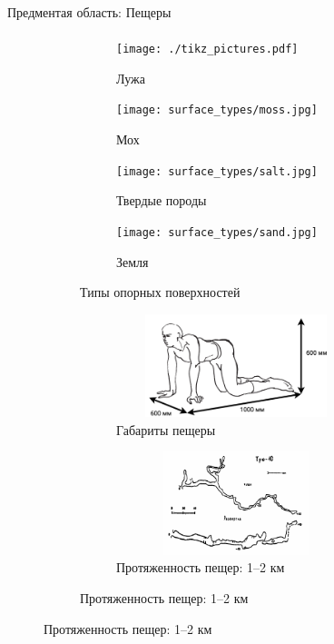 \begin{frame}[t]{Предментая область: Пещеры}
    \framesubtitle{}
    \vspace{-0.8cm}
    \begin{figure}[H]
        \begin{subfigure}{0.49\textwidth}
            \begin{subfigure}[b]{0.49\textwidth}
                \centering\texttt{[image: ./tikz\_pictures.pdf]}
                \caption{Лужа}
            \end{subfigure}
            \hfill
            \begin{subfigure}[b]{0.49\textwidth}
                \centering\texttt{[image: surface\_types/moss.jpg]}\\
                \caption{Мох}
            \end{subfigure}

            \begin{subfigure}[b]{0.49\textwidth}
                \centering\texttt{[image: surface\_types/salt.jpg]}\\
                \caption{Твердые породы}
            \end{subfigure}
            \begin{subfigure}[b]{0.49\textwidth}
                \centering\texttt{[image: surface\_types/sand.jpg]}\\
                \caption{Земля}
            \end{subfigure}
            \caption*{Типы опорных поверхностей}
        \end{subfigure}
        \begin{subfigure}{0.49\textwidth}
            \begin{subfigure}{0.99\textwidth}
                \centering\includegraphics[height=3cm,width=1\textwidth,keepaspectratio]{../images/human_crawling.png}
                \caption*{Габариты пещеры}
            \end{subfigure}

            \begin{subfigure}{0.99\textwidth}
                \centering\includegraphics[height=3cm,width=1\textwidth,keepaspectratio]{../images/cave_maps/map3.png}
                \caption*{Протяженность пещер: 1--2 км}
            \end{subfigure}
        \end{subfigure}
    \end{figure}
\end{frame}



